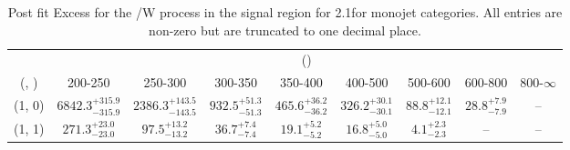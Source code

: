 \begin{table}[h!]
\tiny
\centering
\caption{Post fit Excess for the \ttbar/W process in the signal region for 2.1\ifb for monojet categories. All entries are non-zero but are truncated to one decimal place.\label{tab:excessseppost_sig_ttw_mono}}
\begin{tabular}
{ccccccccc}
	\hline\hline
	& \multicolumn{8}{c}{\scalht (\gev)} \\ 
	 (\njet,  \nb) & 200-250 & 250-300 & 300-350 & 350-400 & 400-500 & 500-600 & 600-800 & 800-$\infty$ \\ [0.8ex] 
\hline
	(1, 0) & $6842.3^{+ 315.9 }_{- 315.9 }$ & $2386.3^{+ 143.5 }_{- 143.5 }$ & $932.5^{+ 51.3 }_{- 51.3 }$ & $465.6^{+ 36.2 }_{- 36.2 }$ & $326.2^{+ 30.1 }_{- 30.1 }$ & $88.8^{+ 12.1 }_{- 12.1 }$ & $28.8^{+ 7.9 }_{- 7.9 }$ & -- \\[0.5ex] 
	(1, 1) & $271.3^{+ 23.0 }_{- 23.0 }$ & $97.5^{+ 13.2 }_{- 13.2 }$ & $36.7^{+ 7.4 }_{- 7.4 }$ & $19.1^{+ 5.2 }_{- 5.2 }$ & $16.8^{+ 5.0 }_{- 5.0 }$ & $4.1^{+ 2.3 }_{- 2.3 }$ & -- & -- \\[0.5ex] 
	\hline
	\hline
\end{tabular}
\end{table}
